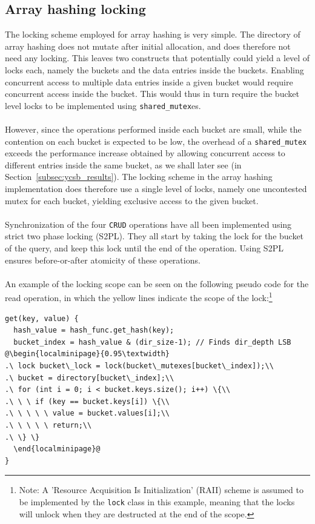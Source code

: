 \documentclass[11pt]{report} %
\begin{document}
\subsection{Array hashing locking}
\label{subsec:design_array_hashing_locking}
The locking scheme employed for array hashing is very simple. The directory of array hashing does not mutate after initial allocation, and does therefore not need any locking. This leaves two constructs that potentially could yield a level of locks each, namely the buckets and the data entries inside the buckets. Enabling concurrent access to multiple data entries inside a given bucket would require concurrent access inside the bucket. This would thus in turn require the bucket level locks to be implemented using \verb|shared_mutex|es. \\
\\
However, since the operations performed inside each bucket are small, while the contention on each bucket is expected to be low, the overhead of a \verb|shared_mutex| exceeds the performance increase obtained by allowing concurrent access to different entries inside the same bucket, as we shall later see (in Section~\ref{subsec:ycsb_results}). The locking scheme in the array hashing implementation does therefore use a single level of locks, namely one uncontested mutex for each bucket, yielding exclusive access to the given bucket.\\
\\
Synchronization of the four \verb|CRUD| operations have all been implemented using strict two phase locking (S2PL). They all start by taking the lock for the bucket of the query, and keep this lock until the end of the operation. Using S2PL ensures before-or-after atomicity of these operations. \\
\\
An example of the locking scope can be seen on the following pseudo code for the read operation, in which the yellow lines indicate the scope of the lock:\footnote{Note: A 'Resource Acquisition Is Initialization' (RAII) scheme is assumed to be implemented by the \verb|lock| class in this example, meaning that the locks will unlock when they are destructed at the end of the scope.}\\
\begin{fminipage}{\linewidth}
\begin{lstlisting}[escapechar=@]
get(key, value) {
  hash_value = hash_func.get_hash(key);
  bucket_index = hash_value & (dir_size-1); // Finds dir_depth LSB  @\begin{localminipage}{0.95\textwidth}
.\ lock bucket\_lock = lock(bucket\_mutexes[bucket\_index]);\\
.\ bucket = directory[bucket\_index];\\
.\ for (int i = 0; i < bucket.keys.size(); i++) \{\\
.\ \ \ if (key == bucket.keys[i]) \{\\
.\ \ \ \ \ value = bucket.values[i];\\
.\ \ \ \ \ return;\\
.\ \} \}
  \end{localminipage}@
}
\end{lstlisting}
\end{fminipage}
\end{document}
